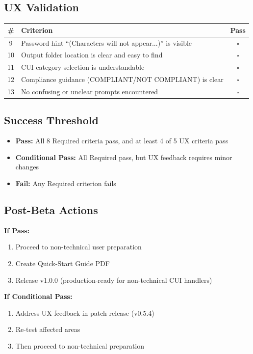 \documentclass[11pt,letterpaper]{article}
\begin{document}
\begin{enumerate}
\subsection*{UX Validation}

\begin{tabularx}{\textwidth}{|c|X|c|}
\hline
\textbf{\#} & \textbf{Criterion} & \textbf{Pass} \\
\hline
9 & Password hint ``(Characters will not appear...)'' is visible & $\square$ \\
\hline
10 & Output folder location is clear and easy to find & $\square$ \\
\hline
11 & CUI category selection is understandable & $\square$ \\
\hline
12 & Compliance guidance (COMPLIANT/NOT COMPLIANT) is clear & $\square$ \\
\hline
13 & No confusing or unclear prompts encountered & $\square$ \\
\hline
\end{tabularx}

\subsection*{Success Threshold}

\begin{itemize}
    \item \textbf{Pass:} All 8 Required criteria pass, and at least 4 of 5 UX criteria pass
    \item \textbf{Conditional Pass:} All Required pass, but UX feedback requires minor changes
    \item \textbf{Fail:} Any Required criterion fails
\end{itemize}

\subsection*{Post-Beta Actions}

\textbf{If Pass:}
\begin{enumerate}
    \item Proceed to non-technical user preparation
    \item Create Quick-Start Guide PDF
    \item Release v1.0.0 (production-ready for non-technical CUI handlers)
\end{enumerate}

\textbf{If Conditional Pass:}
\begin{enumerate}
    \item Address UX feedback in patch release (v0.5.4)
    \item Re-test affected areas
    \item Then proceed to non-technical preparation
\end{enumerate}


\end{enumerate}
\end{document}
